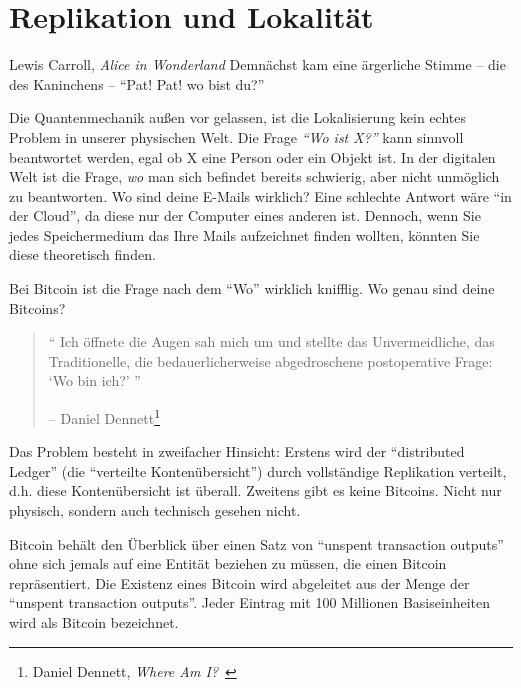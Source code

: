 \chapter{Replikation und Lokalität}
\label{les:3}

\begin{chapquote}{Lewis Carroll, \textit{Alice in Wonderland}}
Demnächst kam eine ärgerliche Stimme -- die des Kaninchens -- \enquote{Pat! Pat! wo bist du?}
\end{chapquote}

Die Quantenmechanik außen vor gelassen, ist die Lokalisierung kein echtes
Problem in unserer physischen Welt. Die Frage \textit{\enquote{Wo ist X?}} kann
sinnvoll beantwortet werden, egal ob X eine Person oder ein Objekt ist. In der
digitalen Welt ist die Frage, \textit{wo} man sich befindet bereits schwierig,
aber nicht unmöglich zu beantworten. Wo sind deine E-Mails wirklich? Eine
schlechte Antwort wäre \enquote{in der Cloud}, da diese nur der Computer eines
anderen ist. Dennoch, wenn Sie jedes Speichermedium das Ihre Mails aufzeichnet
finden wollten, könnten Sie diese theoretisch finden.

Bei Bitcoin ist die Frage nach dem \enquote{Wo} wirklich knifflig. Wo genau sind
deine Bitcoins?

\begin{quotation}\begin{samepage}
\enquote{
Ich öffnete die Augen sah mich um und stellte das Unvermeidliche, das
Traditionelle, die bedauerlicherweise abgedroschene postoperative Frage:
\enquote{Wo bin ich?}
}
\begin{flushright} -- Daniel Dennett\footnote{Daniel Dennett, \textit{Where Am I?}~\cite{where-am-i}}
\end{flushright}\end{samepage}\end{quotation}

Das Problem besteht in zweifacher Hinsicht: Erstens wird der
\enquote{distributed Ledger} (die \enquote{verteilte Kontenübersicht}) durch
vollständige Replikation verteilt, d.h. diese Kontenübersicht ist überall.
Zweitens gibt es keine Bitcoins. Nicht nur physisch, sondern auch technisch
gesehen nicht.

Bitcoin behält den Überblick über einen Satz von \enquote{unspent transaction
outputs} ohne sich jemals auf eine Entität beziehen zu müssen, die einen Bitcoin
repräsentiert. Die Existenz eines Bitcoin wird abgeleitet aus der Menge der
\enquote{unspent transaction outputs}. Jeder Eintrag mit 100 Millionen
Basiseinheiten wird als Bitcoin bezeichnet.

